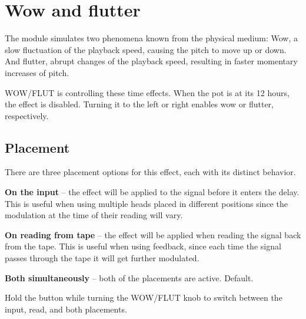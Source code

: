 \documentclass[11pt]{article}
\begin{document}
\begin{minipage}[t]{0.45\textwidth}
\setlength{\parskip}{6pt}

\section{Wow and flutter}

The module simulates two phenomena known from the physical medium:
Wow, a slow fluctuation of the playback speed, causing the pitch to move up or
down.
And flutter, abrupt changes of the playback speed, resulting in faster momentary
increases of pitch.

WOW/FLUT is controlling these time effects. When the pot is at its 12 hours, the
effect is disabled. Turning it to the left or right enables wow or flutter,
respectively.

\subsection{Placement}

There are three placement options for this effect, each with its distinct
behavior.

\textbf{On the input} -- the effect will be applied to the signal before it
  enters the delay. This is useful when using multiple heads placed in different
  positions since the modulation at the time of their reading will vary.

\textbf{On reading from tape} -- the effect will be applied when reading the
  signal back from the tape. This is useful when using feedback, since each time
  the signal passes through the tape it will get further modulated.

\textbf{Both simultaneously} -- both of the placements are active. Default.

Hold the button while turning the WOW/FLUT knob to switch between the input,
read, and both placements.

\end{minipage}%
\begin{minipage}{0.05\textwidth}
\phantom{ }
\end{minipage}%
\end{document}
